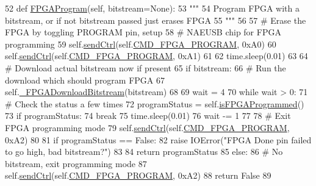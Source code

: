 \begin{DoxyCode}
52     \textcolor{keyword}{def }\hyperlink{classsoftware_1_1chipwhisperer_1_1hardware_1_1naeusb_1_1fpga_1_1FPGA_ae74c1a11050e1ddf3dad7f7557592334}{FPGAProgram}(self, bitstream=None):
53         \textcolor{stringliteral}{"""}
54 \textcolor{stringliteral}{        Program FPGA with a bitstream, or if not bitstream passed just erases FPGA}
55 \textcolor{stringliteral}{        """}
56 
57         \textcolor{comment}{# Erase the FPGA by toggling PROGRAM pin, setup}
58         \textcolor{comment}{# NAEUSB chip for FPGA programming}
59         self.\hyperlink{classsoftware_1_1chipwhisperer_1_1hardware_1_1naeusb_1_1fpga_1_1FPGA_a18dce2e9b27a4e1dbafe37295bc7ba87}{sendCtrl}(self.\hyperlink{classsoftware_1_1chipwhisperer_1_1hardware_1_1naeusb_1_1fpga_1_1FPGA_a611615e3ac2381fd6e320ee4910d7f36}{CMD\_FPGA\_PROGRAM}, 0xA0)
60         self.\hyperlink{classsoftware_1_1chipwhisperer_1_1hardware_1_1naeusb_1_1fpga_1_1FPGA_a18dce2e9b27a4e1dbafe37295bc7ba87}{sendCtrl}(self.\hyperlink{classsoftware_1_1chipwhisperer_1_1hardware_1_1naeusb_1_1fpga_1_1FPGA_a611615e3ac2381fd6e320ee4910d7f36}{CMD\_FPGA\_PROGRAM}, 0xA1)
61 
62         time.sleep(0.01)
63 
64         \textcolor{comment}{# Download actual bitstream now if present}
65         \textcolor{keywordflow}{if} bitstream:
66             \textcolor{comment}{# Run the download which should program FPGA}
67             self.\hyperlink{classsoftware_1_1chipwhisperer_1_1hardware_1_1naeusb_1_1fpga_1_1FPGA_aac94297243f0755786b09c29f83773d6}{\_FPGADownloadBitstream}(bitstream)
68 
69             wait = 4
70             \textcolor{keywordflow}{while} wait > 0:
71                 \textcolor{comment}{# Check the status a few times}
72                 programStatus = self.\hyperlink{classsoftware_1_1chipwhisperer_1_1hardware_1_1naeusb_1_1fpga_1_1FPGA_a362fcaeea905ecfb91fbe56e36d29c7a}{isFPGAProgrammed}()
73                 \textcolor{keywordflow}{if} programStatus:
74                     \textcolor{keywordflow}{break}
75                 time.sleep(0.01)
76                 wait -= 1
77 
78             \textcolor{comment}{# Exit FPGA programming mode}
79             self.\hyperlink{classsoftware_1_1chipwhisperer_1_1hardware_1_1naeusb_1_1fpga_1_1FPGA_a18dce2e9b27a4e1dbafe37295bc7ba87}{sendCtrl}(self.\hyperlink{classsoftware_1_1chipwhisperer_1_1hardware_1_1naeusb_1_1fpga_1_1FPGA_a611615e3ac2381fd6e320ee4910d7f36}{CMD\_FPGA\_PROGRAM}, 0xA2)
80 
81             \textcolor{keywordflow}{if} programStatus == \textcolor{keyword}{False}:
82                 \textcolor{keywordflow}{raise} IOError(\textcolor{stringliteral}{"FPGA Done pin failed to go high, bad bitstream?"})
83 
84             \textcolor{keywordflow}{return} programStatus
85         \textcolor{keywordflow}{else}:
86             \textcolor{comment}{# No bitstream, exit programming mode}
87             self.\hyperlink{classsoftware_1_1chipwhisperer_1_1hardware_1_1naeusb_1_1fpga_1_1FPGA_a18dce2e9b27a4e1dbafe37295bc7ba87}{sendCtrl}(self.\hyperlink{classsoftware_1_1chipwhisperer_1_1hardware_1_1naeusb_1_1fpga_1_1FPGA_a611615e3ac2381fd6e320ee4910d7f36}{CMD\_FPGA\_PROGRAM}, 0xA2)
88             \textcolor{keywordflow}{return} \textcolor{keyword}{False}
89 
\end{DoxyCode}
